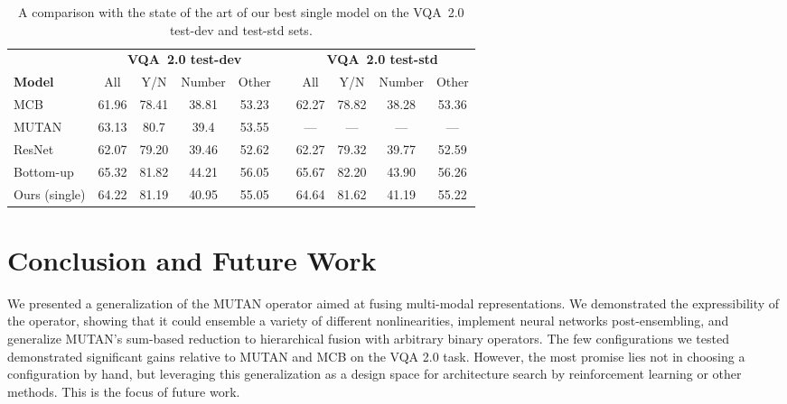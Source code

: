 \begin{table*}[!t]
\centering
\caption{A comparison with the state of the art of our best single model on the
         VQA~2.0 test-dev and test-std sets.}
\begin{tabular}{l*{9}{c}}
& \multicolumn{4}{c}{\textbf{VQA~2.0 test-dev}} & & \multicolumn{4}{c}{\textbf{VQA~2.0 test-std}} \\
\textbf{Model} & All & Y/N & Number & Other & & All & Y/N & Number & Other \\
\midrule
MCB\footnotemark & 61.96 & 78.41 & 38.81 & 53.23 & & 62.27 & 78.82 & 38.28 & 53.36 \\
MUTAN\footnotemark & 63.13 & 80.7 & 39.4 & 53.55 & & --- & --- & --- & --- \\
ResNet\footnotemark & 62.07 & 79.20 & 39.46 & 52.62 & & 62.27 & 79.32 & 39.77 & 52.59 \\
Bottom-up\footnotemark & 65.32 & 81.82 & 44.21 & 56.05 & & 65.67 & 82.20 & 43.90 & 56.26 \\
\midrule
Ours (single) & 64.22 & 81.19 & 40.95 & 55.05 & & 64.64 & 81.62 & 41.19 & 55.22 \\
\midrule
\end{tabular}
\label{tab:sota-comparison}
\end{table*}


\section{Conclusion and Future Work}

We presented a generalization of the MUTAN operator aimed at fusing multi-modal
representations. We demonstrated the expressibility of the operator, showing
that it could ensemble a variety of different nonlinearities, implement neural
networks post-ensembling, and generalize MUTAN's sum-based reduction to
hierarchical fusion with arbitrary binary operators. The few configurations we
tested demonstrated significant gains relative to MUTAN and MCB on the VQA 2.0
task. However, the most promise lies not in choosing a configuration by hand,
but leveraging this generalization as a design space for architecture search by
reinforcement learning or other methods. This is the focus of future work.

\FloatBarrier{}
